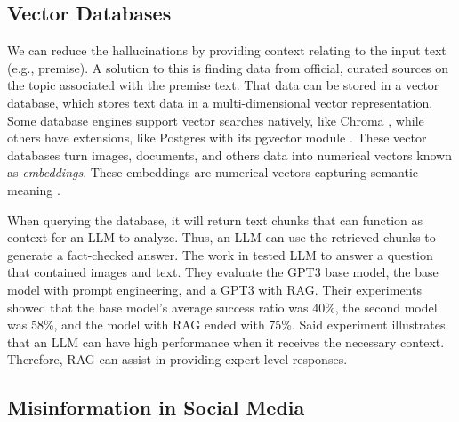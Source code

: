 \subsection{Vector Databases}
We can reduce the hallucinations by providing context relating to the input text (e.g., premise). A solution to this is finding data from official, curated sources  on the topic associated with the premise text. That data can be stored
in a vector database, which stores text data in a multi-dimensional vector representation.  Some database  engines support vector searches natively, like Chroma \cite{chroma}, while others have extensions,
like Postgres with its pgvector  module \cite{pgvector}. These vector databases turn images, documents, and others data into numerical vectors known as {\em embeddings}. These embeddings are numerical vectors capturing semantic meaning \cite{10455990}.
 
When querying the database, it will return text chunks that can function as context for an LLM to analyze. Thus, an LLM can use the retrieved chunks to generate a fact-checked answer.%
The work in \cite{10683437}  tested LLM to answer a question that contained images and text. They evaluate the GPT3 base model, the base model with prompt engineering,
and a GPT3 with RAG. Their experiments showed that the base model's average success ratio was 40\%, the second model was 58\%, and the model with RAG ended with 75\%. Said experiment illustrates  that
an LLM can have high performance when it receives the necessary context. Therefore, RAG can assist in providing expert-level responses.%

\subsection{Misinformation in Social Media}

